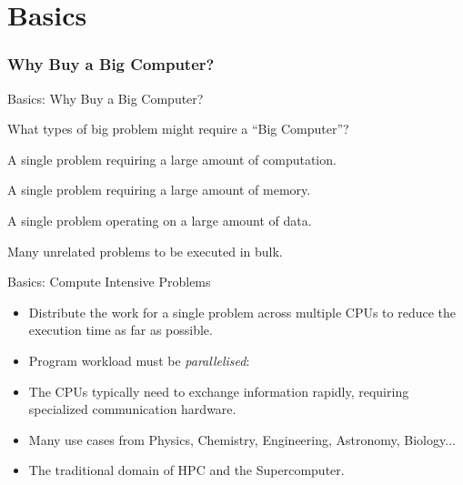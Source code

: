 \part{Basics}
\begin{frame}
\partpage
\end{frame}

\section{Why Buy a Big Computer?}

\begin{frame}{Basics: Why Buy a Big Computer?}

What types of big problem might require a ``Big Computer''?

\begin{description}
\pause
\item[\textit{Compute Intensive:}]{A single problem requiring a large amount of computation.}
\pause
\item[\textit{Memory Intensive:}]{A single problem requiring a large amount of memory.}
\pause
\item[\textit{Data Intensive:}]{A single problem operating on a large amount of data.}
\pause
\item[\textit{High Throughput:}]{Many unrelated problems to be executed in bulk.}
\end{description}
\end{frame}

\begin{frame}{Basics: Compute Intensive Problems}
\begin{itemize}
\item{Distribute the \alert{work} for a \alert{single problem} across multiple CPUs to reduce the execution time as far as possible.}
\pause
\item{Program workload must be \emph{parallelised}:}
\pause
\item{The CPUs typically need to exchange information rapidly, requiring specialized communication hardware.}
\pause
\item{Many use cases from Physics, Chemistry, Engineering, Astronomy, Biology...}
\item{The traditional domain of \alert{HPC} and the \alert{Supercomputer}.}
\end{itemize}
\end{frame}


